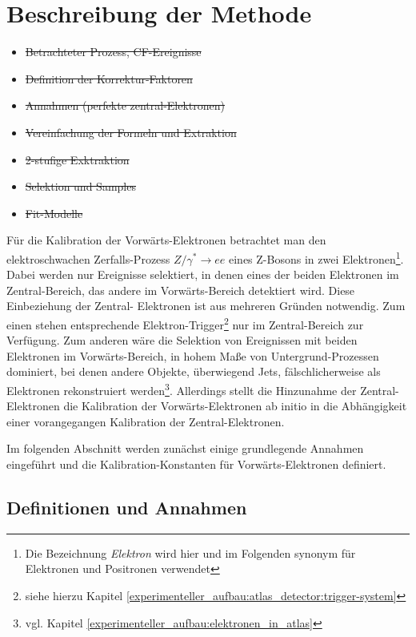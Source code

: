 \section{Beschreibung der Methode}
\label{energy_calibration:beschreibung_der_methode}

\begin{itemize}
    \item \sout{Betrachteter Prozess, CF-Ereignisse}
    \item \sout{Definition der Korrektur-Faktoren}
    \item \sout{Annahmen (perfekte zentral-Elektronen)}
    \item \sout{Vereinfachung der Formeln und Extraktion}
    \item \sout{2-stufige Exktraktion}
    \item \sout{Selektion und Samples}
    \item \sout{Fit-Modelle}
\end{itemize}

Für die Kalibration der Vorwärts-Elektronen betrachtet man den elektroschwachen
Zerfalls-Prozess $Z/\gamma^* \rightarrow ee$ eines Z-Bosons in zwei
Elektronen\footnote{Die Bezeichnung \textit{Elektron} wird hier und im
Folgenden synonym für Elektronen und Positronen verwendet}. Dabei werden nur
Ereignisse selektiert, in denen eines der beiden Elektronen im Zentral-Bereich,
das andere im Vorwärts-Bereich detektiert wird. Diese Einbeziehung der Zentral-
Elektronen ist aus mehreren Gründen notwendig. Zum einen stehen entsprechende
Elektron-Trigger\footnote{siehe hierzu Kapitel
\ref{experimenteller_aufbau:atlas_detector:trigger-system}}
nur im Zentral-Bereich zur Verfügung. Zum anderen wäre die Selektion von
Ereignissen mit beiden Elektronen im Vorwärts-Bereich, in hohem Maße von
Untergrund-Prozessen dominiert, bei denen andere Objekte, überwiegend Jets,
fälschlicherweise als Elektronen rekonstruiert werden\footnote{vgl. Kapitel
\ref{experimenteller_aufbau:elektronen_in_atlas}}.
Allerdings stellt die Hinzunahme der Zentral-Elektronen die Kalibration der
Vorwärts-Elektronen ab initio in die Abhängigkeit einer vorangegangen 
Kalibration der Zentral-Elektronen.

Im folgenden Abschnitt werden zunächst einige grundlegende Annahmen eingeführt
und die Kalibration-Konstanten für Vorwärts-Elektronen definiert.



\subsection{Definitionen und Annahmen}
\label{energy_calibration:beschreibung_der_methode:definitionen_und_annahmen}

